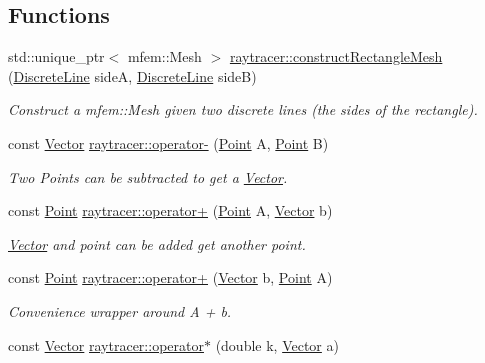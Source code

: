 \subsection*{Functions}
\begin{DoxyCompactItemize}
\item 
std\+::unique\+\_\+ptr$<$ mfem\+::\+Mesh $>$ \hyperlink{group__api_ga289222e1fc63a6e9126da5bbfa7b6a12}{raytracer\+::construct\+Rectangle\+Mesh} (\hyperlink{structraytracer_1_1DiscreteLine}{Discrete\+Line} sideA, \hyperlink{structraytracer_1_1DiscreteLine}{Discrete\+Line} sideB)
\begin{DoxyCompactList}\small\item\em Construct a mfem\+::\+Mesh given two discrete lines (the sides of the rectangle). \end{DoxyCompactList}\item 
const \hyperlink{classraytracer_1_1Vector}{Vector} \hyperlink{group__api_ga600238d4569fec2dd95c6fec3f4e8b30}{raytracer\+::operator-\/} (\hyperlink{classraytracer_1_1Point}{Point} A, \hyperlink{classraytracer_1_1Point}{Point} B)
\begin{DoxyCompactList}\small\item\em Two Points can be subtracted to get a \hyperlink{classraytracer_1_1Vector}{Vector}. \end{DoxyCompactList}\item 
const \hyperlink{classraytracer_1_1Point}{Point} \hyperlink{group__api_gaad5be472789d2f603e44e25b5d835708}{raytracer\+::operator+} (\hyperlink{classraytracer_1_1Point}{Point} A, \hyperlink{classraytracer_1_1Vector}{Vector} b)
\begin{DoxyCompactList}\small\item\em \hyperlink{classraytracer_1_1Vector}{Vector} and point can be added get another point. \end{DoxyCompactList}\item 
const \hyperlink{classraytracer_1_1Point}{Point} \hyperlink{group__api_ga4d268f6d854b65fc7b0c2b7331e233ae}{raytracer\+::operator+} (\hyperlink{classraytracer_1_1Vector}{Vector} b, \hyperlink{classraytracer_1_1Point}{Point} A)
\begin{DoxyCompactList}\small\item\em Convenience wrapper around A + b. \end{DoxyCompactList}\item 
const \hyperlink{classraytracer_1_1Vector}{Vector} \hyperlink{group__api_ga03236160eb138b0ee089b67a71d4978e}{raytracer\+::operator$\ast$} (double k, \hyperlink{classraytracer_1_1Vector}{Vector} a)

\end{DoxyCompactItemize}
